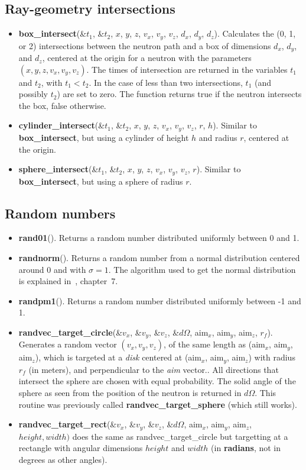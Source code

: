 \subsection{Ray-geometry intersections}
\begin{itemize}
\item {\bf box\_intersect}(\&$t_1$, \&$t_2$, $x$, $y$, $z$, $v_x$, $v_y$, $v_z$,
  $d_x$, $d_y$, $d_z$). Calculates the (0, 1, or 2) intersections between
  the neutron path and a box of dimensions $d_x$, $d_y$, and $d_z$,
  centered at the origin for a neutron with the parameters
  $(x,y,z,v_x,v_y,v_z)$. The times of intersection are returned
  in the variables $t_1$ and $t_2$, with $t_1 < t_2$. In the case
  of less than two intersections, $t_1$ (and possibly $t_2$) are set to
  zero. The function returns true if the neutron intersects the box,
  false otherwise.
\item {\bf cylinder\_intersect}(\&$t_1$, \&$t_2$, $x$, $y$, $z$, $v_x$, $v_y$, $v_z$,
  $r$, $h$).  Similar to {\bf box\_intersect}, but using a cylinder of height $h$ and radius $r$,
  centered at the origin.
\item {\bf sphere\_intersect}(\&$t_1$, \&$t_2$, $x$, $y$, $z$, $v_x$, $v_y$, $v_z$,
  $r$). Similar to {\bf box\_intersect}, but using a sphere
  of radius $r$. 
\end{itemize}

\subsection{Random numbers}
\begin{itemize}
\item {\bf rand01}(). Returns a random number distributed uniformly between 0 and 1.
\item {\bf randnorm}(). Returns a random number from a normal
  distribution centered around 0 and with $\sigma=1$. The algorithm used to
  get the normal distribution is explained in~\cite{num_rep}, chapter~7.
\item {\bf randpm1}(). Returns a random number distributed uniformly between -1 and 1.
\item {\bf randvec\_target\_circle}(\&$v_x$, \&$v_y$, \&$v_z$, \&$d\Omega$,
  aim$_x$, aim$_y$, aim$_z$, $r_f$). Generates a random vector $(v_x, v_y,
  v_z)$, of the same length as (aim$_x$, aim$_y$, aim$_z$), which is
  targeted at a \emph{disk} centered at (aim$_x$, aim$_y$, aim$_z$) with
  radius $r_f$ (in meters), and perpendicular to the \emph{aim} vector.. All directions
  that intersect the sphere are chosen with equal probability. The solid
  angle of the sphere as seen from the position of the neutron is returned
  in $d\Omega$. This routine was previously called {\bf randvec\_target\_sphere}
  (which still works).
\item {\bf randvec\_target\_rect}(\&$v_x$, \&$v_y$, \&$v_z$, \&$d\Omega$,
  aim$_x$, aim$_y$, aim$_z$,$height, width)$ does the same as       randvec\_target\_circle but targetting at a rectangle with angular dimensions
  $height$ and $width$ (in {\bf radians}, not in degrees as other angles).
\end{itemize}

